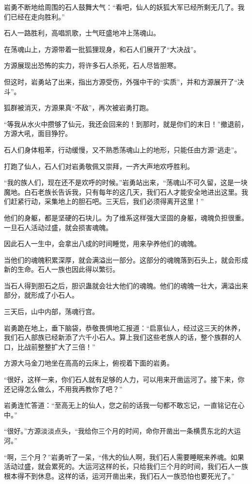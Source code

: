 \begin{this_body}
岩勇不断地给周围的石人鼓舞大气：“看吧，仙人的妖狐大军已经所剩无几了。我们已经在走向胜利。”

石人一路胜利，高唱凯歌，士气旺盛地冲上荡魂山。

在荡魂山上，方源带着一批狐狸现身，和石人们展开了“大决战”。

方源展现出恐怖的实力，将许多石人杀死，石人尽皆胆寒。

但这时，岩勇站了出来，指出方源受伤，外强中干的“实质”，并和方源展开了“决斗”。

狐群被消灭，方源果真“不敌”，再次被岩勇打跑。

“等我从水火中攒够了仙元，我还会回来的！到那时，就是你们的末日！”撤退前，方源大吼，面目狰狞。

石人们身体粗苯，行动缓慢，又不熟悉荡魂山上的地形，只能任由方源“逃走”。

打跑了仙人，石人们对岩勇敬佩又崇拜，一齐大声地欢呼胜利。

“我的族人们，现在还不是欢呼的时候。”岩勇站出来，“荡魂山不可久留，这是一块魔地。白石老族长告诉我，只有每年的这几天，我们石人才能安全地进出这里。我们赶紧行动，采集地上的胆石吧。三天后，我们必须得离开这里！”

他们的身躯，都是坚硬的石块儿。为了维系这样强大坚固的身躯，魂魄负担很重。一旦石人活动过盛，就会损害魂魄。

因此石人一生中，会拿出八成的时间睡觉，用来孕养他们的魂魄。

当他们的魂魄积累深厚，就会满溢出一部分。这部分的魂魄落到石头上，就会形成新的生命。石人一族也因此得以繁衍。

当石人得到胆石之后，胆识蛊就会壮大他们的魂魄。他们的魂魄一壮大，满溢出来部分，就形成了小石人。

三天后，山中内部，荡魂行宫。

岩勇跪在地上，垂下脑袋，恭敬畏惧地汇报道：“启禀仙人，经过这三天的休养，我们石人部族已经新添了六千小石人。算上我们这些老族人的话，整个族群的人口，比战前整整扩大了三倍！”

方源大马金刀地坐在高高的云床上，俯视着下面的岩勇。

“很好，这样一来，你们石人就有足够的人力，可以用来开凿运河了。接下来，你还记得怎么做么，不用我再教你了吧？”

岩勇连忙答道：“至高无上的仙人，您之前的话我一句都不敢忘记，一直铭记在心中。”

“很好。”方源淡淡点头，“我给你三个月的时间，命你开凿出一条横贯东北的大运河。”

“啊，三个月？”岩勇听了一呆，“伟大的仙人啊，我们石人需要睡眠来养魂。如果活动过盛，就会累死的。大运河这样的长，只给我们三个月的时间，我们石人一族根本得不到休息。这样的话，运河开凿出来，我们石人一族恐怕也要死光了。”


\end{this_body}
